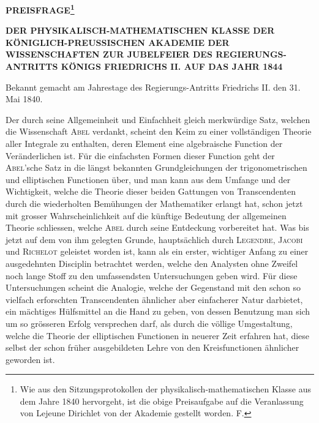 \documentclass[11pt]{article}
\newcommand{\scn}[1]{\textsc{#1}}
\begin{document}
\begin{center}
{\Large\bfseries PREISFRAGE\footnote{Wie aus den Sitzungsprotokollen der physikalisch-mathematischen Klasse aus dem Jahre 1840 hervorgeht, ist die obige Preisaufgabe auf die Veranlassung von Lejeune Dirichlet von der Akademie gestellt worden. F.}\par}
\vspace{0.3em}
{\large\bfseries DER PHYSIKALISCH-MATHEMATISCHEN KLASSE DER KÖNIGLICH-PREUSSISCHEN AKADEMIE DER WISSENSCHAFTEN ZUR JUBELFEIER DES REGIERUNGS-ANTRITTS KÖNIGS FRIEDRICHS II. AUF DAS JAHR 1844\par}
\vspace{0.8em}
\end{center}

\begin{center}Bekannt gemacht am Jahrestage des Regierungs-Antritts Friedrichs II. den 31. Mai 1840.\end{center}

Der durch seine Allgemeinheit und Einfachheit gleich merkwürdige Satz, welchen die Wissenschaft \scn{Abel} verdankt, scheint den Keim zu einer vollständigen Theorie aller Integrale zu enthalten, deren Element eine algebraische Function der Veränderlichen ist. Für die einfachsten Formen dieser Function geht der \scn{Abel}'sche Satz in die längst bekannten Grundgleichungen der trigonometrischen und elliptischen Functionen über, und man kann aus dem Umfange und der Wichtigkeit, welche die Theorie dieser beiden Gattungen von Transcendenten durch die wiederholten Bemühungen der Mathematiker erlangt hat, schon jetzt mit grosser Wahrscheinlichkeit auf die künftige Bedeutung der allgemeinen Theorie schliessen, welche \scn{Abel} durch seine Entdeckung vorbereitet hat. Was bis jetzt auf dem von ihm gelegten Grunde, hauptsächlich durch \scn{Legendre}, \scn{Jacobi} und \scn{Richelot} geleistet worden ist, kann als ein erster, wichtiger Anfang zu einer ausgedehnten Disciplin betrachtet werden, welche den Analysten ohne Zweifel noch lange Stoff zu den umfassendsten Untersuchungen geben wird. Für diese Untersuchungen scheint die Analogie, welche der Gegenstand mit den schon so vielfach erforschten Transcendenten ähnlicher aber einfacherer Natur darbietet, ein mächtiges Hülfsmittel an die Hand zu geben, von dessen Benutzung man sich um so grösseren Erfolg versprechen darf, als durch die völlige Umgestaltung, welche die Theorie der elliptischen Functionen in neuerer Zeit erfahren hat, diese selbst der schon früher ausgebildeten Lehre von den Kreisfunctionen ähnlicher geworden ist.
\end{document}
